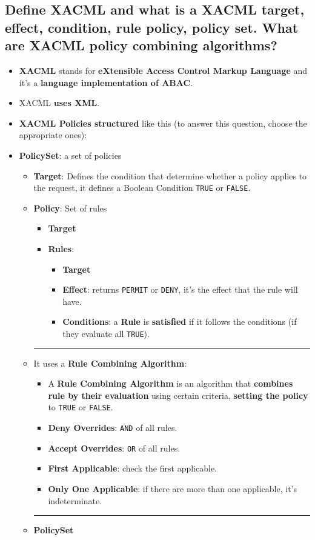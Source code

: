 \documentclass[9pt, letterpaper]{article}
\begin{document}
\newpage

\subsection{Define XACML and what is a XACML target, effect, condition, rule policy, policy set. What are XACML policy combining algorithms?}
\begin{itemize}
	\item \textbf{XACML} stands for \textbf{eXtensible Access Control Markup Language} and it's a \textbf{language implementation of ABAC}.
	\item XACML \textbf{uses XML}.
	\item \textbf{XACML Policies structured} like this (to answer this question, choose the appropriate ones):
		\item \textbf{PolicySet}: a set of policies
		\begin{itemize}
			\item \textbf{Target}: Defines the condition that determine whether a policy applies to the request, it defines a Boolean Condition {\tt TRUE} or {\tt FALSE}.
		\item \textbf{Policy}: Set of rules
		\begin{itemize}
			\item \textbf{Target}
			\item \textbf{Rules}:
			\begin{itemize}
				\item \textbf{Target}
				\item \textbf{Effect}: returns {\tt PERMIT} or {\tt DENY}, it's the effect that the rule will have.
				\item \textbf{Conditions}: a \textbf{Rule} is \textbf{satisfied} if it follows the conditions (if they evaluate all {\tt TRUE}).
			\end{itemize}
		\end{itemize} 
		{\noindent\color{gray}\rule{16.5cm}{0.4pt}}
		\item It uses a \textbf{Rule Combining Algorithm}:
		\begin{itemize}
			\item A \textbf{Rule Combining Algorithm} is an algorithm that \textbf{combines rule by their evaluation} using certain criteria, \textbf{setting the policy} to {\tt TRUE} or {\tt FALSE}.
			\item \textbf{Deny Overrides}: {\tt AND} of all rules.
			\item \textbf{Accept Overrides}: {\tt OR}  of all rules.
			\item \textbf{First Applicable}: check the first applicable.
			\item \textbf{Only One Applicable}: if there are more than one applicable, it's indeterminate.
		\end{itemize}
		{\noindent\color{gray}\rule{16.5cm}{0.4pt}}
		\item \textbf{PolicySet}
	\end{itemize}
\end{itemize}
\end{document}

